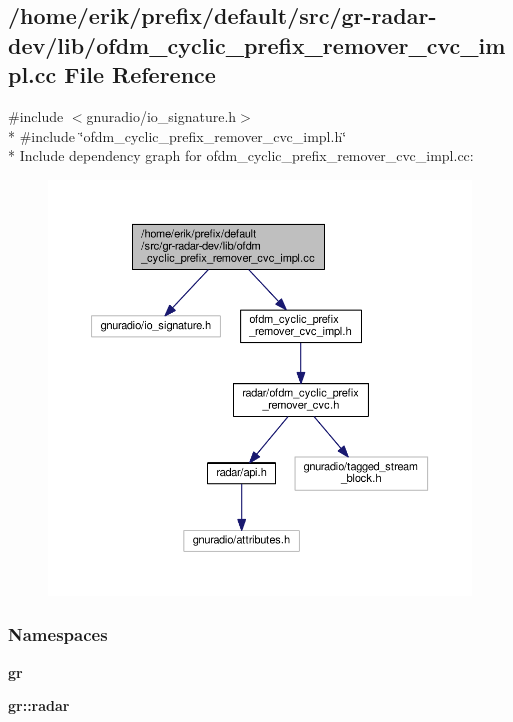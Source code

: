 \subsection{/home/erik/prefix/default/src/gr-\/radar-\/dev/lib/ofdm\+\_\+cyclic\+\_\+prefix\+\_\+remover\+\_\+cvc\+\_\+impl.cc File Reference}
\label{ofdm__cyclic__prefix__remover__cvc__impl_8cc}
{\ttfamily \#include $<$gnuradio/io\+\_\+signature.\+h$>$}\\*
{\ttfamily \#include \char`\"{}ofdm\+\_\+cyclic\+\_\+prefix\+\_\+remover\+\_\+cvc\+\_\+impl.\+h\char`\"{}}\\*
Include dependency graph for ofdm\+\_\+cyclic\+\_\+prefix\+\_\+remover\+\_\+cvc\+\_\+impl.\+cc\+:
\nopagebreak
\begin{figure}[H]
\begin{center}
\leavevmode
\includegraphics[width=350pt]{d1/dd5/ofdm__cyclic__prefix__remover__cvc__impl_8cc__incl}
\end{center}
\end{figure}
\subsubsection*{Namespaces}
\begin{DoxyCompactItemize}
\item 
 {\bf gr}
\item 
 {\bf gr\+::radar}
\end{DoxyCompactItemize}
